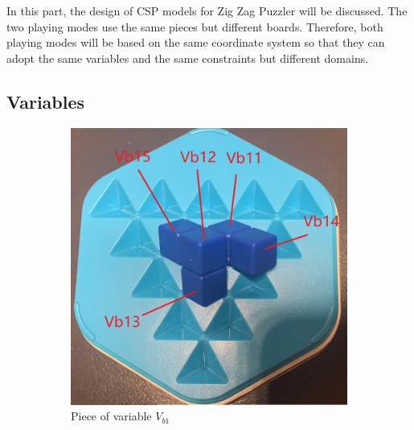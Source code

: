 In this part, the design of CSP models for Zig Zag Puzzler will be discussed. The two playing modes use the same pieces but different boards. Therefore, both playing modes will be based on the same coordinate system so that they can adopt the same variables and the same constraints but different domains. 
\subsection{Variables}
\begin{figure}[htbp]
\centering
\begin{subfigure}[b]{0.25\textwidth}
\centering
\includegraphics[width=\textwidth]{figs/3Dblue1.jpg}
\caption{Piece of variable $V_{b1}$}
  \label{fig:3Dblue1}
\end{subfigure}
\begin{subfigure}[b]{0.25\textwidth}
\centering

\end{subfigure}
\end{figure}
